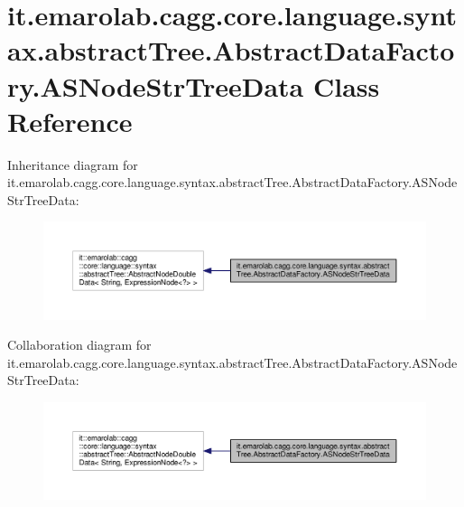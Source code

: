\hypertarget{classit_1_1emarolab_1_1cagg_1_1core_1_1language_1_1syntax_1_1abstractTree_1_1AbstractDataFactory_1_1ASNodeStrTreeData}{\section{it.\-emarolab.\-cagg.\-core.\-language.\-syntax.\-abstract\-Tree.\-Abstract\-Data\-Factory.\-A\-S\-Node\-Str\-Tree\-Data Class Reference}
\label{classit_1_1emarolab_1_1cagg_1_1core_1_1language_1_1syntax_1_1abstractTree_1_1AbstractDataFactory_1_1ASNodeStrTreeData}
}


Inheritance diagram for it.\-emarolab.\-cagg.\-core.\-language.\-syntax.\-abstract\-Tree.\-Abstract\-Data\-Factory.\-A\-S\-Node\-Str\-Tree\-Data\-:\nopagebreak
\begin{figure}[H]
\begin{center}
\leavevmode
\includegraphics[width=350pt]{classit_1_1emarolab_1_1cagg_1_1core_1_1language_1_1syntax_1_1abstractTree_1_1AbstractDataFactory52a27a84d34eb9a1df5494851c4bb244}
\end{center}
\end{figure}


Collaboration diagram for it.\-emarolab.\-cagg.\-core.\-language.\-syntax.\-abstract\-Tree.\-Abstract\-Data\-Factory.\-A\-S\-Node\-Str\-Tree\-Data\-:\nopagebreak
\begin{figure}[H]
\begin{center}
\leavevmode
\includegraphics[width=350pt]{classit_1_1emarolab_1_1cagg_1_1core_1_1language_1_1syntax_1_1abstractTree_1_1AbstractDataFactorydbc88f3e268078d36485efbb2446d8b4}
\end{center}
\end{figure}
